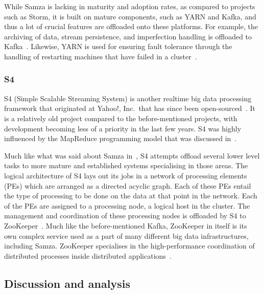 \documentclass[a4paper,11pt]{article}
\begin{document}
While Samza is lacking in maturity and adoption rates, as compared to projects such as Storm, it is built on mature
components, such as YARN and Kafka, and thus a lot of crucial features are offloaded onto these platforms. For example,
the archiving of data, stream persistence, and imperfection handling is offloaded to Kafka~\cite{bockermann2014survey}.
Likewise, YARN is used for ensuring fault tolerance through the handling of restarting machines that have failed in a
cluster~\cite{bockermann2014survey}.


\subsubsection{S4} %
\label{ssub:s4}

S4 (Simple Scalable Streaming System) is another realtime big data processing framework that originated at Yahoo!, Inc.\
that has since been open-sourced~\cite{neumeyer2010s4}. It is a relatively old project compared to the before-mentioned projects,
with development becoming less of a priority in the last few years. S4 was highly influenced by the MapReduce programming
model that was discussed in~\sectref{ssub:mapreduce_and_gfs}.

Much like what was said about Samza in~, S4 attempts offload several lower level tasks to more
mature and established systems specialising in those areas. The logical architecture of S4 lays out its jobs in a
network of processing elements (PEs) which are arranged as a directed acyclic graph. Each of these PEs entail the type
of processing to be done on the data at that point in the network. Each of the PEs are assigned to a processing node, a
logical host in the cluster. The management and coordination of these processing nodes is offloaded by S4 to
ZooKeeper~\cite{kamburugamuve_survey_2014}. Much like the before-mentioned Kafka, ZooKeeper in itself is its own complex
service used as a part of many different big data infrastructures, including Samza. ZooKeeper specialises in the high-performance
coordination of distributed processes inside distributed applications~\cite{hunt2010zookeeper}.



\subsection{Discussion and analysis} %
\label{sub:processing_conclusion}
\end{document}
